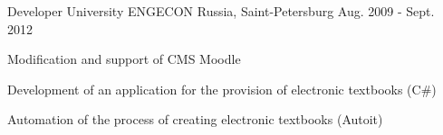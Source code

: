 \begin{cventries}
  \cventry
    {Developer}
    {University ENGECON}
    {Russia, Saint-Petersburg}
    {Aug. 2009 - Sept. 2012}
    {
      \begin{cvitems}
        \item {Modification and support of CMS Moodle}
        \item {Development of an application for the provision of electronic textbooks (C\#)}
        \item {Automation of the process of creating electronic textbooks (Autoit)}
      \end{cvitems}
    }

\end{cventries}
